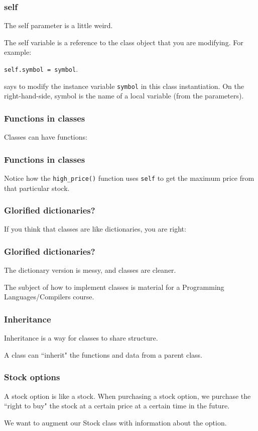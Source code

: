 \documentclass{beamer}
\begin{document}
\begin{frame}
\frametitle{self}
The self parameter is a little weird.

\vspace{0.2in}

The self variable is a reference to the class object that you are modifying.  For example:

\begin{center}
\texttt{self.symbol = symbol}.
\end{center}

says to modify the instance variable \texttt{symbol} in this class instantiation.  On the right-hand-side, symbol is the name of a local variable (from the parameters).

\end{frame}

\begin{frame}
\frametitle{Functions in classes}
Classes can have functions:

\end{frame}


\begin{frame}
\frametitle{Functions in classes}
Notice how the \texttt{high\_price()} function uses \texttt{self} to get the maximum price from that particular stock.
\end{frame}


\begin{frame}
\frametitle{Glorified dictionaries?}
If you think that classes are like dictionaries, you are right:
\end{frame}

\begin{frame}
\frametitle{Glorified dictionaries?}
The dictionary version is messy, and classes are cleaner.

\vspace{0.2in}

The subject of how to implement classes is material for a Programming Languages/Compilers course.
\end{frame}

\begin{frame}
\frametitle{Inheritance}
Inheritance is a way for classes to share structure.

\vspace{0.2in}
A class can ``inherit" the functions and data from a parent class.
\end{frame}

\begin{frame}
\frametitle{Stock options}
A stock option is like a stock.  When purchasing a stock option, we purchase the ``right to buy" the stock at a certain price at a certain time in the future.

\vspace{0.2in}
We want to augment our Stock class with information about the option.
\end{frame}
\end{document}

